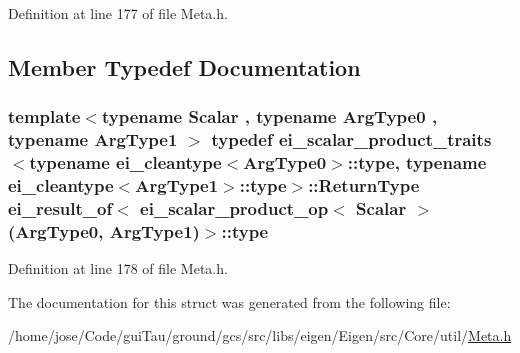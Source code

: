 Definition at line 177 of file Meta.\-h.



\subsection{Member Typedef Documentation}
\hypertarget{structei__result__of_3_01ei__scalar__product__op_3_01_scalar_01_4_07_arg_type0_00_01_arg_type1_08_4_a3023414bdb89cee5248736ac07041ce2}{
\subsubsection[{type}]{\setlength{\rightskip}{0pt plus 5cm}template$<$typename Scalar , typename Arg\-Type0 , typename Arg\-Type1 $>$ typedef {\bf ei\-\_\-scalar\-\_\-product\-\_\-traits}$<$typename {\bf ei\-\_\-cleantype}$<$Arg\-Type0$>$\-::{\bf type}, typename {\bf ei\-\_\-cleantype}$<$Arg\-Type1$>$\-::{\bf type}$>$\-::Return\-Type {\bf ei\-\_\-result\-\_\-of}$<$ {\bf ei\-\_\-scalar\-\_\-product\-\_\-op}$<$ Scalar $>$(Arg\-Type0, Arg\-Type1)$>$\-::{\bf type}}}\label{structei__result__of_3_01ei__scalar__product__op_3_01_scalar_01_4_07_arg_type0_00_01_arg_type1_08_4_a3023414bdb89cee5248736ac07041ce2}


Definition at line 178 of file Meta.\-h.



The documentation for this struct was generated from the following file\-:\begin{DoxyCompactItemize}
\item 
/home/jose/\-Code/gui\-Tau/ground/gcs/src/libs/eigen/\-Eigen/src/\-Core/util/\hyperlink{_meta_8h}{Meta.\-h}\end{DoxyCompactItemize}
